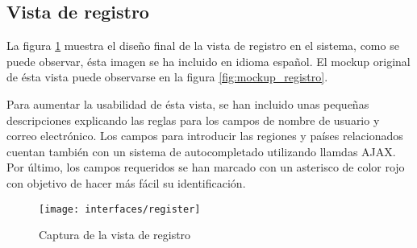 \subsection{Vista de registro}
La figura \ref{fig:interface_registro} muestra el diseño final de la vista de registro en el sistema,  como se puede observar, ésta imagen se ha incluido en idioma español.  El mockup original de ésta vista puede observarse en la figura \ref{fig:mockup_registro}.

Para aumentar la usabilidad de ésta vista, se han incluido unas pequeñas descripciones explicando las reglas para los campos de nombre de usuario y correo electrónico.  Los campos para introducir las regiones y países relacionados cuentan también con un sistema de autocompletado utilizando llamdas AJAX.  Por último, los campos requeridos se han marcado con un asterisco de color rojo con objetivo de hacer más fácil su identificación.
\begin{figure}[h]
	\centering
	\texttt{[image: interfaces/register]}
	\caption{Captura de la vista de registro}
	\label{fig:interface_registro}
\end{figure}


